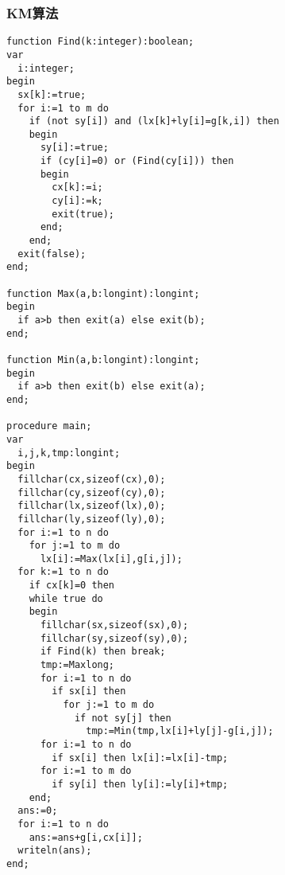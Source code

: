 \subsubsection{KM算法}
\begin{verbatim}
function Find(k:integer):boolean;
var
  i:integer;
begin
  sx[k]:=true;
  for i:=1 to m do
    if (not sy[i]) and (lx[k]+ly[i]=g[k,i]) then
    begin
      sy[i]:=true;
      if (cy[i]=0) or (Find(cy[i])) then
      begin
        cx[k]:=i;
        cy[i]:=k;
        exit(true);
      end;
    end;
  exit(false);
end;

function Max(a,b:longint):longint;
begin
  if a>b then exit(a) else exit(b);
end;

function Min(a,b:longint):longint;
begin
  if a>b then exit(b) else exit(a);
end;

procedure main;
var
  i,j,k,tmp:longint;
begin
  fillchar(cx,sizeof(cx),0);
  fillchar(cy,sizeof(cy),0);
  fillchar(lx,sizeof(lx),0);
  fillchar(ly,sizeof(ly),0);
  for i:=1 to n do
    for j:=1 to m do
      lx[i]:=Max(lx[i],g[i,j]);
  for k:=1 to n do
    if cx[k]=0 then
    while true do
    begin
      fillchar(sx,sizeof(sx),0);
      fillchar(sy,sizeof(sy),0);
      if Find(k) then break;
      tmp:=Maxlong;
      for i:=1 to n do
        if sx[i] then
          for j:=1 to m do
            if not sy[j] then
              tmp:=Min(tmp,lx[i]+ly[j]-g[i,j]);
      for i:=1 to n do
        if sx[i] then lx[i]:=lx[i]-tmp;
      for i:=1 to m do
        if sy[i] then ly[i]:=ly[i]+tmp;
    end;
  ans:=0;
  for i:=1 to n do
    ans:=ans+g[i,cx[i]];
  writeln(ans);
end;
\end{verbatim}
